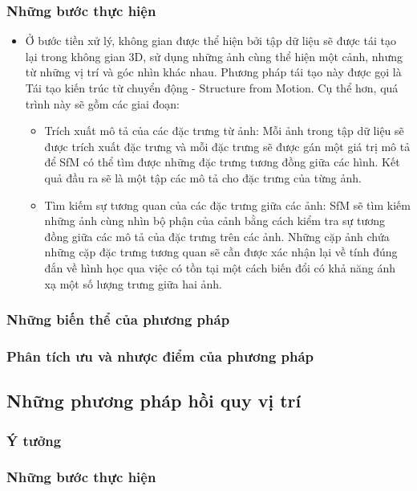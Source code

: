 \subsubsection*{Những bước thực hiện}
\begin{itemize}
    \item Ở bước tiền xử lý, không gian được thể hiện bởi tập dữ liệu sẽ được tái tạo lại trong không gian 3D, sử dụng những ảnh cùng thể hiện một cảnh, nhưng từ những vị trí và góc nhìn khác nhau. Phương pháp tái tạo này được gọi là Tái tạo kiến trúc từ chuyển động - Structure from Motion. Cụ thể hơn, quá trình này sẽ gồm các giai đoạn:
    \begin{itemize}
        \item Trích xuất mô tả của các đặc trưng từ ảnh: Mỗi ảnh trong tập dữ liệu sẽ được trích xuất đặc trưng và mỗi đặc trưng sẽ được gán một giá trị mô tả để SfM có thể tìm được những đặc trưng tương đồng giữa các hình. Kết quả đầu ra sẽ là một tập các mô tả cho đặc trưng của từng ảnh.
        \item Tìm kiếm sự tương quan của các đặc trưng giữa các ảnh: SfM sẽ tìm kiếm những ảnh cùng nhìn bộ phận của cảnh bằng cách kiểm tra sự tương đồng giữa các mô tả của đặc trưng trên các ảnh. Những cặp ảnh chứa những cặp đặc trưng tương quan sẽ cần được xác nhận lại về tính đúng đắn về hình học qua việc có tồn tại một cách biến đổi có khả năng ánh xạ một số lượng trưng giữa hai ảnh.
    \end{itemize}
\end{itemize}
\subsubsection*{Những biến thể của phương pháp}
\subsubsection*{Phân tích ưu và nhược điểm của phương pháp}

\subsection{Những phương pháp hồi quy vị trí}
\subsubsection*{Ý tưởng}
\subsubsection*{Những bước thực hiện}
